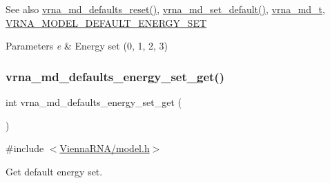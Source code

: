 \begin{DoxySeeAlso}{See also}
\mbox{\hyperlink{group__model__details_ga70834424cf804d149937de89f80ceb45}{vrna\+\_\+md\+\_\+defaults\+\_\+reset()}}, \mbox{\hyperlink{group__model__details_ga8ac6ff84936282436f822644bf841f66}{vrna\+\_\+md\+\_\+set\+\_\+default()}}, \mbox{\hyperlink{group__model__details_ga1f8a10e12a0a1915f2a4eff0b28ea17c}{vrna\+\_\+md\+\_\+t}}, \mbox{\hyperlink{group__model__details_ga6fcf6b2d0f89256cdbd166486c9b6e1e}{V\+R\+N\+A\+\_\+\+M\+O\+D\+E\+L\+\_\+\+D\+E\+F\+A\+U\+L\+T\+\_\+\+E\+N\+E\+R\+G\+Y\+\_\+\+S\+ET}} 
\end{DoxySeeAlso}

\begin{DoxyParams}{Parameters}
{\em e} & Energy set (0, 1, 2, 3) \\
\hline
\end{DoxyParams}
\mbox{\label{group__model__details_ga017ed6afb1cba2b7f242412cab618b53}} 
\subsubsection{\texorpdfstring{vrna\+\_\+md\+\_\+defaults\+\_\+energy\+\_\+set\+\_\+get()}{vrna\_md\_defaults\_energy\_set\_get()}}
{\footnotesize\ttfamily int vrna\+\_\+md\+\_\+defaults\+\_\+energy\+\_\+set\+\_\+get (\begin{DoxyParamCaption}\item[{void}]{ }\end{DoxyParamCaption})}



{\ttfamily \#include $<$\mbox{\hyperlink{model_8h}{Vienna\+R\+N\+A/model.\+h}}$>$}



Get default energy set. 

